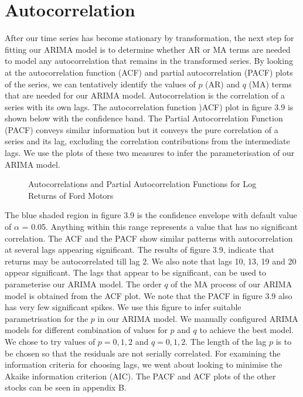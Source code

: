 \section{Autocorrelation}
After our time series has become stationary by transformation, the next step for fitting our ARIMA model is to determine whether AR or MA terms are needed to model any autocorrelation that remains in the transformed series. By looking at the autocorrelation function (ACF) and partial autocorrelation (PACF) plots of the series, we can tentatively identify the values of $p$ (AR) and $q$ (MA) terms that are needed for our ARIMA model. Autocorrelation is the correlation of a series with its own lags. The autocorrelation function )ACF) plot in figure 3.9 is shown below with the confidence band. The Partial Autocorrelation Function (PACF) conveys similar information but it conveys the pure correlation of a series and its lag, excluding the correlation contributions from the intermediate lags. We use the plots of these two measures to infer the parameterisation of our ARIMA model. 

\begin{figure}[h]
    \centering
    \qquad
    \caption{Autocorrelations and Partial Autocorrelation Functions for Log Returns of Ford Motors}
    \label{}%
\end{figure}

The blue shaded region in figure 3.9 is the confidence envelope with default value of $\alpha$ = 0.05. Anything within this range represents a value that has no significant correlation. The ACF and the PACF show similar patterns with autocorrelation at several lags appearing significant. The results of figure 3.9, indicate that returns may be autocorrelated till lag 2. We also note that lags 10, 13, 19 and 20 appear significant. The lags that appear to be significant, can be used to parameterise our ARIMA model. The order $q$ of the MA process of our ARIMA model is obtained from the ACF plot. We note that the PACF in figure 3.9 also has very few significant spikes. We use this figure to infer suitable parametrisation for the $p$ in our ARIMA model. We manually configured ARIMA models for different combination of values for $p$ and $q$ to achieve the best model. We chose to try values of $p = 0,1,2$ and $q = 0,1,2$. The length of the lag $p$ is to be chosen so that the residuals are not serially correlated. For examining the information criteria for choosing lags, we went about looking to minimise the Akaike information criterion (AIC). The PACF and ACF plots of the other stocks can be seen in appendix B.





